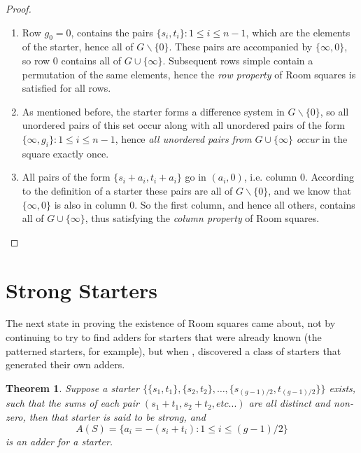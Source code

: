 \documentclass[11pt, a4paper]{book}\usepackage[]{graphicx}\usepackage[]{xcolor}
\newcounter{example}
\newtheorem{theorem}{Theorem}
\begin{document}
\begin{proof}
\begin{enumerate}
  \item{Row $g_0 = 0$, contains the pairs
      $\{s_i, t_i\}:1 \leq i \leq n-1$,
      which are the elements of the starter,
      hence all of $G \backslash \{0\}$. These pairs are
      accompanied by $\{\infty, 0\}$, so row 0 contains all
      of $G \cup \{\infty\}$. Subsequent rows simple
      contain a permutation of the same elements, hence
      the \emph{row property} of Room squares is satisfied for
      all rows.}
  \item{As mentioned before, the starter forms a difference
      system in $G \backslash \{0\}$, so all unordered
      pairs of this set occur along with all unordered
      pairs of the form
      $\{\infty, g_i\}: 1 \leq i \leq n - 1$,
      hence \emph{all unordered pairs from}
      $G \cup \{\infty\}$ \emph{occur} in the square exactly once.}
  \item{All pairs of the form $\{s_i + a_i, t_i + a_i\}$ go in
      $(a_i, 0)$, i.e. column 0. According to the
      definition of a starter these pairs are all of $G
      \backslash \{0\}$, and we know that $\{\infty,0\}$
      is also in column 0. So the first column, and hence
      all others, contains all of $G \cup \{\infty\}$,
      thus satisfying the \emph{column property} of Room
      squares.}
\end{enumerate}
\end{proof}

\section{Strong Starters}

The next state in proving the existence of Room squares came
about, not by continuing to try to find adders for starters
that were already known (the patterned starters, for
example), but when
\cite{mullinFurnishingRoomSquares1969},
discovered a
class of starters that generated their own adders.

\begin{theorem}
\label{thm:furnishing}
Suppose a starter
$\{\{s_1, t_1\}, \{s_2, t_2\}, \ldots, \{s_{(g - 1)/2}, t_{(g - 1)/2}\}\}$
exists, such that the sums of each pair
$(s_1 + t_1, s_2 + t_2, etc...)$
are all distinct and non-zero, then that starter is said
to be strong, and
\begin{equation}
 A(S) = \{a_i = -(s_i + t_i):1 \leq i \leq (g - 1)/2\}
\end{equation}
is an adder for a starter.
\end{theorem}
\end{document}
